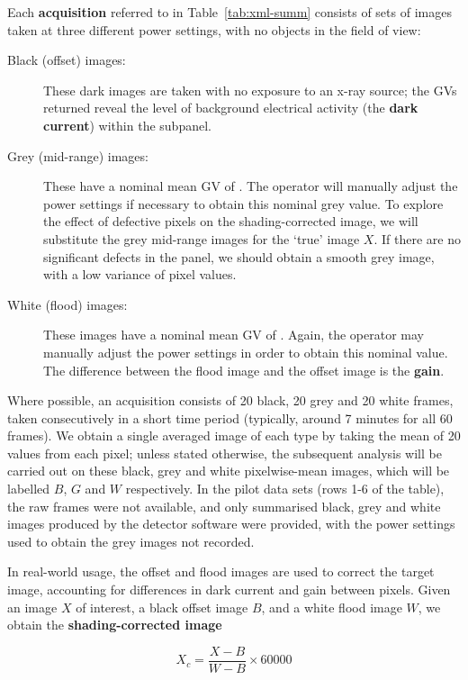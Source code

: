 \documentclass[\main/IO-Pixels.tex]{subfiles}
\begin{document}
Each \textbf{acquisition} referred to in Table~\ref{tab:xml-summ} consists of sets of images taken at three different power settings, with no objects in the field of view:
\begin{description}

\item[Black (offset) images:] These dark images are taken with no exposure to an x-ray source; the GVs returned reveal the level of background electrical activity (the \textbf{dark current}) within the subpanel.
\item[Grey (mid-range) images:] These have a nominal mean GV of . The operator will manually adjust the power settings if necessary to obtain this nominal grey value. To explore the effect of defective pixels on the shading-corrected image, we will substitute the grey mid-range images for the `true' image $X$. If there are no significant defects in the panel, we should obtain a smooth grey image, with a low variance of pixel values.
\item[White (flood) images:] These images have a nominal mean GV of . Again, the operator may manually adjust the power settings in order to obtain this nominal value. The difference between the flood image and the offset image is the \textbf{gain}.
\end{description}

Where possible, an acquisition consists of 20 black, 20 grey and 20 white frames, taken consecutively in a short time period (typically, around 7 minutes for all 60 frames). We obtain a single averaged image of each type by taking the mean of 20 values from each pixel; unless stated otherwise, the subsequent analysis will be carried out on these black, grey and white pixelwise-mean images, which will be labelled $B$, $G$ and $W$ respectively. In the pilot data sets (rows 1-6 of the table), the raw frames were not available, and only summarised black, grey and white images produced by the detector software were provided, with the power settings used to obtain the grey images not recorded.

In real-world usage, the offset and flood images are used to correct the target image, accounting for differences in dark current and gain between pixels. Given an image $X$ of interest, a black offset image $B$, and a white flood image $W$, we obtain the \textbf{shading-corrected image}

\begin{equation}
\label{eq:shading-correction}
	X_c = \frac{X -B}{W - B} \times 60000
\end{equation}
\end{document}

